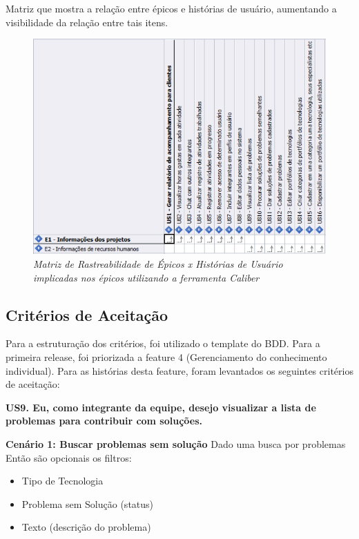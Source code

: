Matriz que mostra a relação entre épicos e histórias de usuário, aumentando a visibilidade da relação entre tais itens. 

\begin{figure}[H]
\centering\includegraphics[scale=0.5]{figuras/rastreabilidade3.png}
\caption{\textit{Matriz de Rastreabilidade de Épicos x Histórias de Usuário implicadas nos épicos utilizando a ferramenta Caliber}}
\end{figure}

\subsection{Critérios de Aceitação}
Para a estruturação dos critérios, foi utilizado o template do BDD. Para a primeira release, foi priorizada a feature 4 (Gerenciamento do conhecimento individual). Para as histórias desta feature, foram levantados os seguintes critérios de aceitação:

\textbf{US9. Eu, como integrante da equipe, desejo visualizar a lista de problemas para contribuir com soluções.}

\textbf{Cenário 1: Buscar problemas sem solução}
Dado uma busca por problemas\\
Então são opcionais os filtros:  
\begin{itemize}
\item Tipo de Tecnologia
\item Problema sem Solução (status)
\item Texto (descrição do problema)
\end{itemize} 

